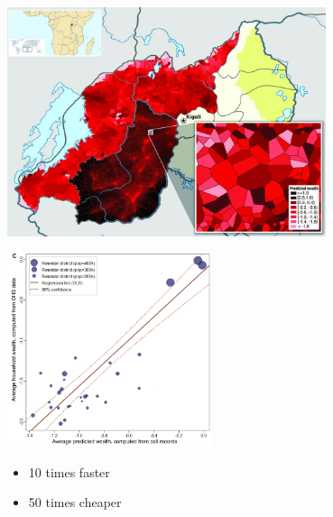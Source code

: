 \documentclass[aspectratio=169]{beamer}
\begin{document}
\begin{frame}

\begin{center}
\includegraphics[width=0.7\textwidth]{figures/blumenstock_predicting_2015_fig2}
\end{center}

\end{frame}
\begin{frame}

\begin{center}
\includegraphics[width=0.45\textwidth]{figures/blumenstock_predicting_2015_fig3c}
\end{center}

\pause

\begin{itemize}
\item 10 times faster
\item 50 times cheaper
\end{itemize}

\end{frame}
\end{document}
